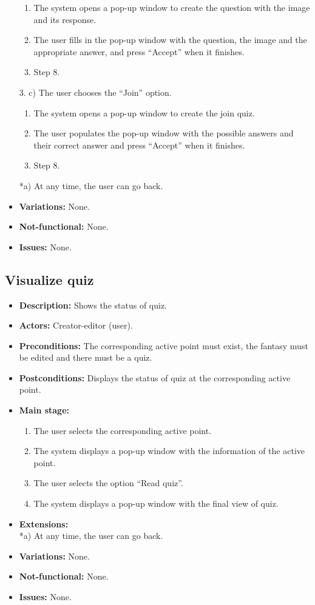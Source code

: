 \begin{itemize}
	\begin{enumerate}
		\item The system opens a pop-up window to create the question with the image and its response.
		\item The user fills in the pop-up window with the question, the image and the appropriate answer, and press ``Accept'' when it finishes.
		\item Step 8.
	\end{enumerate}
	3. c) The user chooses the ``Join'' option.
	\begin{enumerate}
		\item The system opens a pop-up window to create the join quiz.
		\item The user populates the pop-up window with the possible answers and their correct answer and press ``Accept'' when it finishes.
		\item Step 8.
	\end{enumerate}
	*a) At any time, the user can go back.
	\item \textbf{Variations:} None.
	\item \textbf{Not-functional:} None.
	\item \textbf{Issues:} None.
\end{itemize}

\subsection{Visualize quiz}
\begin{itemize}
	\item \textbf{Description:} Shows the status of quiz.
	\item \textbf{Actors:} Creator-editor (user).
	\item \textbf{Preconditions:} The corresponding active point must exist, the fantasy must be edited and there must be a quiz.
	\item \textbf{Postconditions:} Displays the status of quiz at the corresponding active point.
	\item \textbf{Main stage:}
	\begin{enumerate}
		\item The user selects the corresponding active point.
		\item The system displays a pop-up window with the information of the active point.
		\item The user selects the option ``Read quiz''.
		\item The system displays a pop-up window with the final view of quiz.
	\end{enumerate}
	\item \textbf{Extensions:} \\ *a) At any time, the user can go back.
	\item \textbf{Variations:} None.
	\item \textbf{Not-functional:} None.
	\item \textbf{Issues:} None.
\end{itemize}

